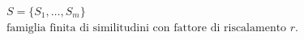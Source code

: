 \documentclass[preview]{standalone}
\begin{document}
\begin{align*}
S = \{S_1, \dots, S_m\} \\ \text{famiglia finita di similitudini con fattore di riscalamento } r.
\end{align*}
\end{document}
